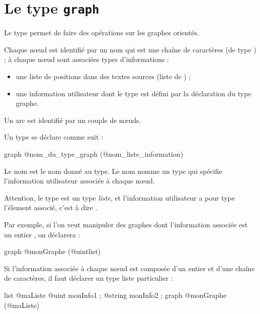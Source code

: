 
\chapter{Le type \texttt{graph}}

Le type  permet de faire des opérations sur les graphes orientés.

Chaque nœud est identifié par un nom qui est une chaîne de caractères (de type ) ; à chaque nœud sont associées types d'informations :
\begin{itemize}
  \item une liste de positions dans des textes sources (liste de ) ;
  \item une information utilisateur dont le type est défini par la déclaration du type graphe.
\end{itemize}

Un arc est identifié par un couple de nœuds.


Un type  se déclare comme suit :
\begin{galgascode}
graph @nom_du_type_graph (@nom_liste_information) {
}
\end{galgascode}

Le nom  est le nom donné au type. Le nom  nomme un type qui spécifie l'information utilisateur associée à chaque nœud.

Attention, le type  est un type \emph{liste}, et l'information utilisateur a pour type l'élement associé, c'est à dire . 

Par exemple, si l'on veut manipuler des graphes dont l'information associée est un entier , on déclarera :
\begin{galgascode}
graph @monGraphe (@uintlist) {
}
\end{galgascode}

Si l'information associée à chaque nœud est composée d'un entier et d'une chaîne de caractères, il faut déclarer un type liste particulier :
\begin{galgascode}
list @maListe {
  @uint monInfo1 ;
  @string monInfo2 ;
}
graph @monGraphe (@maListe) {
}
\end{galgascode}






